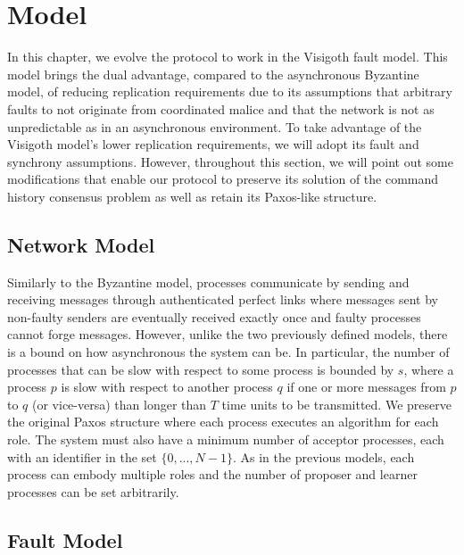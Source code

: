 \section{Model} \label{vft_model}
In this chapter, we evolve the protocol to work in the Visigoth fault model. This model brings the dual advantage, compared to the asynchronous Byzantine model, of reducing replication requirements due to its assumptions that arbitrary faults to not originate from coordinated malice and that the network is not as unpredictable as in an asynchronous environment. To take advantage of the Visigoth model's lower replication requirements, we will adopt its fault and synchrony assumptions. However, throughout this section, we will point out some modifications that enable our protocol to preserve its solution of the command history consensus problem as well as retain its Paxos-like structure. 

\subsection{Network Model}

Similarly to the Byzantine model, processes communicate by sending and receiving messages through authenticated perfect links where messages sent by non-faulty senders are eventually received exactly once and faulty processes cannot forge messages. However, unlike the two previously defined models, there is a bound on how asynchronous the system can be. In particular, the number of processes that can be slow with respect to some process is bounded by $s$, where a process $p$ is slow with respect to another process $q$ if one or more messages from $p$ to $q$ (or vice-versa) than longer than $T$ time units to be transmitted. We preserve the original Paxos structure where each process executes an algorithm for each role. The system must also have a minimum number of acceptor processes, each with an identifier in the set $\{0,...,N-1\}$. As in the previous models, each process can embody multiple roles and the number of proposer and learner processes can be set arbitrarily.

\subsection{Fault Model}

